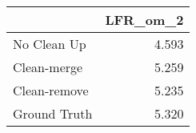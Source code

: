 \begin{tabular}{lr}
\toprule
{} & LFR_om_2 \\
\midrule
No Clean Up  &    4.593 \\
Clean-merge  &    5.259 \\
Clean-remove &    5.235 \\
Ground Truth &    5.320 \\
\bottomrule
\end{tabular}
